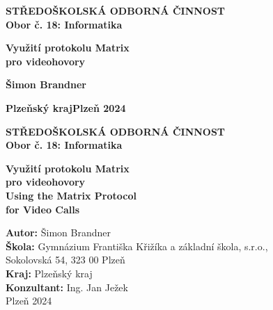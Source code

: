 \begin{center}
    \textbf{\Large{STŘEDOŠKOLSKÁ ODBORNÁ ČINNOST}}\\
    \textbf{\large{Obor č. 18: Informatika}}
    \vspace{8.5cm}

    \textbf{\huge{Využití protokolu Matrix\\ pro videohovory}}
\end{center}
\vspace{8.5cm}

{
    \large{
        \noindent
        \textbf{Šimon Brandner}
    }
}
\begin{center}
    \textbf{\large{Plzeňský kraj}}\hfill\textbf{\large{Plzeň 2024}}
\end{center}

\thispagestyle{empty}
\newpage

\begin{center}
    \textbf{\Large{STŘEDOŠKOLSKÁ ODBORNÁ ČINNOST}}\\
    \textbf{\large{Obor č. 18: Informatika}}
    \vspace{6cm}

    \textbf{\huge{Využití protokolu Matrix\\ pro videohovory}}\\
    \textbf{\huge{Using the Matrix Protocol\\ for Video Calls}}
\end{center}
\vspace{5.5cm}

{
    \large{
        \noindent
        \textbf{Autor:} Šimon Brandner\\
        \textbf{Škola:} Gymnázium Františka Křižíka a základní škola, s.r.o.,\\
        Sokolovská 54, 323 00 Plzeň\\
        \textbf{Kraj:} Plzeňský kraj\\
        \textbf{Konzultant:} Ing. Jan Ježek\\

        \noindent
        \large{Plzeň 2024}
    }
}

\thispagestyle{empty}
\newpage
